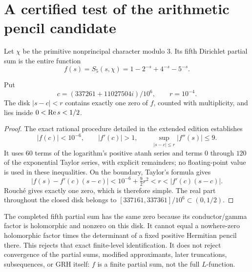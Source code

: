 \section{A certified test of the arithmetic pencil candidate}
Let $\chi$ be the primitive nonprincipal character modulo $3$. Its fifth
Dirichlet partial sum is the entire function
\[
 f(s)=S_5(s,\chi)=1-2^{-s}+4^{-s}-5^{-s}.
\]
\begin{theorem}\label{thm:finite-offline}
Put
\[c=(337261+11027504i)/10^6,\qquad r=10^{-4}.\]
The disk $|s-c|<r$ contains exactly one zero of $f$, counted with
multiplicity, and lies inside $0<\operatorname{Re} s<1/2$.
\end{theorem}
\begin{proof}
The exact rational procedure detailed in the extended edition establishes
\[
 |f(c)|<10^{-6},\qquad |f'(c)|>1,\qquad
 \sup_{|s-c|\le r}|f''(s)|\le9.
\]
It uses $60$ terms of the logarithm's positive atanh series and terms
$0$ through $120$ of the exponential Taylor series, with explicit
remainders; no floating-point value is used in these inequalities.
On the boundary, Taylor's formula gives
\[
 |f(s)-f'(c)(s-c)|<10^{-6}+\tfrac92r^2<r<|f'(c)(s-c)|.
\]
Rouch\'e gives exactly one zero, which is therefore simple.
The real part throughout the closed disk belongs to
$[337161,337361]/10^6\subset(0,1/2)$.
\end{proof}
The completed fifth partial sum has the same zero because its
conductor/gamma factor is holomorphic and nonzero on this disk.
It cannot equal a nowhere-zero holomorphic factor times the determinant of a fixed
positive Hermitian pencil there. This rejects that exact finite-level
identification. It does not reject convergence of the partial sums,
modified approximants, later truncations, subsequences, or GRH itself:
$f$ is a finite partial sum, not the full $L$-function.

